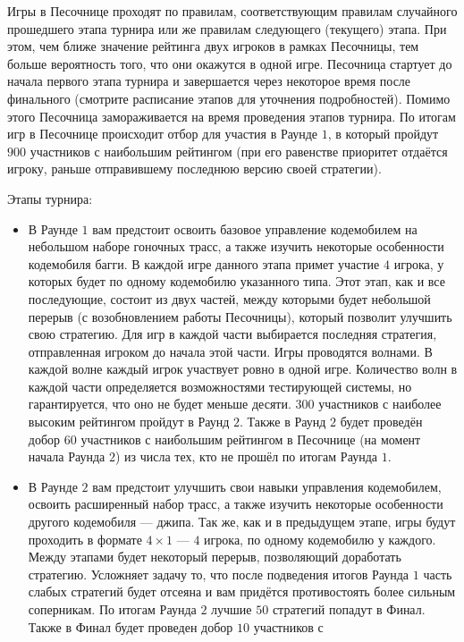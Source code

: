 Игры в Песочнице проходят по правилам, соответствующим правилам случайного прошедшего этапа турнира или же правилам следующего (текущего)
этапа. При этом, чем ближе значение рейтинга двух игроков в рамках Песочницы, тем больше вероятность того, что они окажутся в одной игре.
Песочница стартует до начала первого этапа турнира и завершается через некоторое время после финального (смотрите расписание этапов для
уточнения подробностей). Помимо этого Песочница замораживается на время проведения этапов турнира. По итогам игр в Песочнице происходит
отбор для участия в Раунде $1$, в который пройдут $900$ участников с наибольшим рейтингом (при его равенстве приоритет отдаётся игроку,
раньше отправившему последнюю версию своей стратегии).

Этапы турнира:
\begin{itemize}
  \item В Раунде $1$ вам предстоит освоить базовое управление кодемобилем на небольшом наборе гоночных трасс, а также изучить некоторые
        особенности кодемобиля багги. В каждой игре данного этапа примет участие $4$ игрока, у которых будет по одному кодемобилю указанного
        типа. Этот этап, как и все последующие, состоит из двух частей, между которыми будет небольшой перерыв (с возобновлением работы
        Песочницы), который позволит улучшить свою стратегию. Для игр в каждой части выбирается последняя стратегия, отправленная игроком до
        начала этой части. Игры проводятся волнами. В каждой волне каждый игрок участвует ровно в одной игре. Количество волн в каждой части
        определяется возможностями тестирующей системы, но гарантируется, что оно не будет меньше десяти. $300$ участников с наиболее
        высоким рейтингом пройдут в Раунд $2$. Также в Раунд $2$ будет проведён добор $60$ участников с наибольшим рейтингом в Песочнице (на
        момент начала Раунда $2$) из числа тех, кто не прошёл по итогам Раунда $1$.
  \item В Раунде $2$ вам предстоит улучшить свои навыки управления кодемобилем, освоить расширенный набор трасс, а также изучить некоторые
        особенности другого кодемобиля --- джипа. Так же, как и в предыдущем этапе, игры будут проходить в формате $4\times1$ --- $4$
        игрока, по одному кодемобилю у каждого. Между этапами будет некоторый перерыв, позволяющий доработать стратегию. Усложняет задачу
        то, что после подведения итогов Раунда $1$ часть слабых стратегий будет отсеяна и вам придётся противостоять более сильным
        соперникам. По итогам Раунда $2$ лучшие $50$ стратегий попадут в Финал. Также в Финал будет проведен добор $10$ участников с

\end{itemize}
